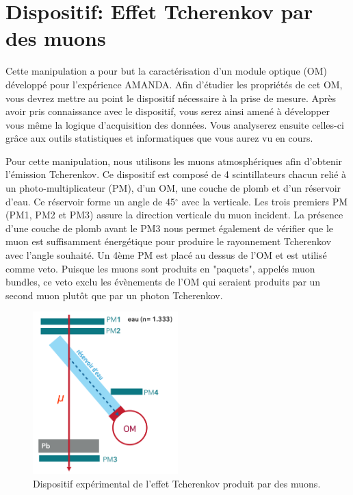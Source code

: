 \section{Dispositif: Effet Tcherenkov par des muons}

Cette manipulation a pour but la caractérisation d'un module optique (OM) développé pour l'expérience AMANDA. Afin d'étudier les propriétés de cet OM, vous devrez mettre au point le dispositif nécessaire à la prise de mesure. Après avoir pris connaissance avec le dispositif, vous serez ainsi amené à développer vous même la logique d'acquisition des données. Vous analyserez ensuite celles-ci grâce aux outils statistiques et informatiques que vous aurez vu en cours. 

Pour cette manipulation, nous utilisons les muons atmosphériques afin d'obtenir l'émission Tcherenkov. Ce dispositif est composé de 4 scintillateurs chacun relié à un photo-multiplicateur (PM), d'un OM, une couche de plomb et d'un réservoir d'eau. Ce réservoir forme un angle de 45$^{\circ}$ avec la verticale. Les trois premiers PM (PM1, PM2 et PM3) assure la direction verticale du muon incident. La présence d'une couche de plomb avant le PM3 nous permet également de vérifier que le muon est suffisamment énergétique pour produire le rayonnement Tcherenkov avec l'angle souhaité. Un 4ème PM est placé au dessus de l'OM et est utilisé comme veto. Puisque les muons sont produits en "paquets", appelés muon bundles, ce veto exclu les évènements de l'OM qui seraient produits par un second muon plutôt que par un photon Tcherenkov.

\begin{figure}[!h]
    \centering
	\includegraphics[width=0.5\textwidth]{figures/Dispositif_2.png}
    \caption{Dispositif expérimental de l'effet Tcherenkov produit par des muons.}
    \label{fig:dispo2} 
\end{figure}

